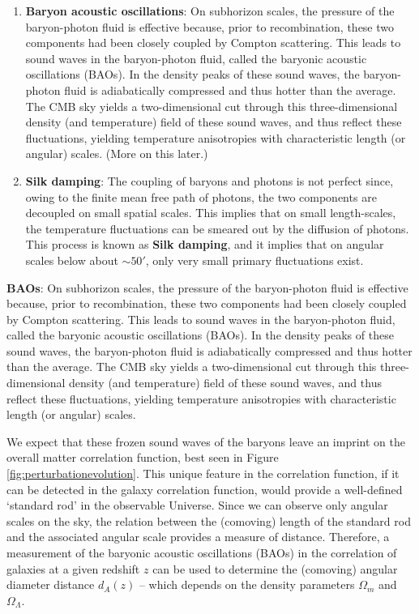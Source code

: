 \documentclass[a4paper,11pt]{article}
\begin{document}
\begin{enumerate}
    \item \textbf{Baryon acoustic oscillations}: On subhorizon scales, the pressure of the baryon-photon fluid is effective because, prior to recombination, these two components had been closely coupled by Compton scattering. This leads to sound waves in the baryon-photon fluid, called the baryonic acoustic oscillations (BAOs). In the density peaks of these sound waves, the baryon-photon fluid is adiabatically compressed and thus hotter than the average. The CMB sky yields a two-dimensional cut through this three-dimensional density (and temperature) field of these sound waves, and thus reflect these fluctuations, yielding temperature anisotropies with characteristic length (or angular) scales. (More on this later.)
    \item \textbf{Silk damping}: The coupling of baryons and photons is not perfect since, owing to the finite mean free path of photons, the two components are decoupled on small spatial scales. This implies that on small length-scales, the temperature fluctuations can be smeared out by the diffusion of photons. This process is known as \textbf{Silk damping}, and it implies that on angular scales below about $\sim50'$, only very small primary fluctuations exist.
\end{enumerate}

{\noindent}\textbf{BAOs}: On subhorizon scales, the pressure of the baryon-photon fluid is effective because, prior to recombination, these two components had been closely coupled by Compton scattering. This leads to sound waves in the baryon-photon fluid, called the baryonic acoustic oscillations (BAOs). In the density peaks of these sound waves, the baryon-photon fluid is adiabatically compressed and thus hotter than the average. The CMB sky yields a two-dimensional cut through this three-dimensional density (and temperature) field of these sound waves, and thus reflect these fluctuations, yielding temperature anisotropies with characteristic length (or angular) scales. 

{\noindent}We expect that these frozen sound waves of the baryons leave an imprint on the overall matter correlation function, best seen in Figure \ref{fig:perturbationevolution}. This unique feature in the correlation function, if it can be detected in the galaxy correlation function, would provide a well-defined `standard rod' in the observable Universe. Since we can observe only angular scales on the sky, the relation between the (comoving) length of the standard rod and the associated angular scale provides a measure of distance. Therefore, a measurement of the baryonic acoustic oscillations (BAOs) in the correlation of galaxies at a given redshift $z$ can be used to determine the (comoving) angular diameter distance $d_A(z)$ --  which depends on the density parameters $\Omega_m$ and $\Omega_\Lambda$.
\end{document}
